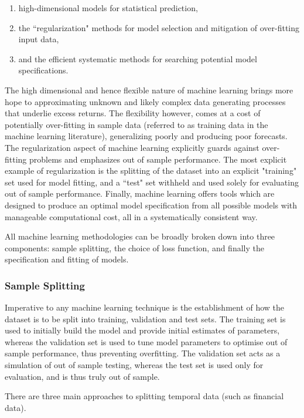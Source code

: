 \documentclass[11pt, a4paper, table]{article}
\begin{document}
\begin{enumerate}
	\item high-dimensional models for statistical prediction, 
	\item the ``regularization" methods for model selection and mitigation of over-fitting input data, 
	\item and the efficient systematic methods for searching potential model specifications.
\end{enumerate}

The high dimensional and hence flexible nature of machine learning brings more hope to approximating unknown and likely complex data generating processes that underlie excess returns. The flexibility however, comes at a cost of potentially over-fitting in sample data (referred to as training data in the machine learning literature), generalizing poorly and producing poor forecasts. The regularization aspect of machine learning explicitly guards against over-fitting problems and emphasizes out of sample performance. The most explicit example of regularization is the splitting of the dataset into an explicit "training" set used for model fitting, and a ``test" set withheld and used solely for evaluating out of sample performance. Finally, machine learning offers tools which are designed to produce an optimal model specification from all possible models with manageable computational cost, all in a systematically consistent way. 

All machine learning methodologies can be broadly broken down into three components: sample splitting, the choice of loss function, and finally the specification and fitting of models.

\subsubsection{Sample Splitting}
\label{sample_split}

Imperative to any machine learning technique is the establishment of how the dataset is to be split into training, validation and test sets. The training set is used to initially build the model and provide initial estimates of parameters, whereas the validation set is used to tune model parameters to optimise out of sample performance, thus preventing overfitting. The validation set acts as a simulation of out of sample testing, whereas the test set is used only for evaluation, and is thus truly out of sample.

There are three main approaches to splitting temporal data (such as financial data). 
\end{document}
